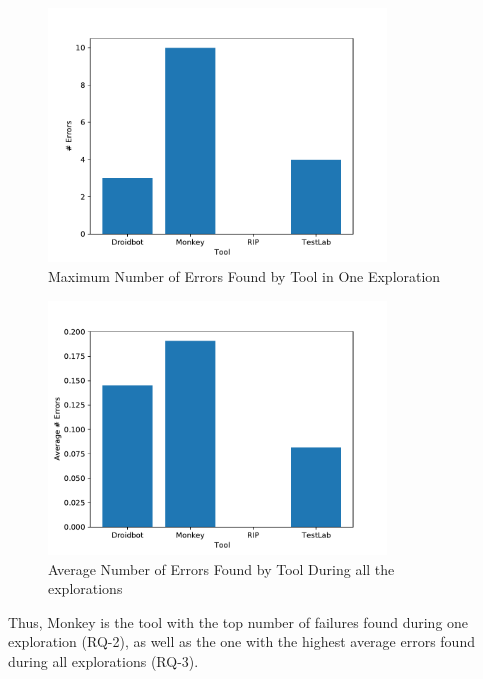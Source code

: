 \begin{figure}[h]
\centering
\includegraphics[width=0.8\textwidth]{../Figures/maxErrors.pdf}
\caption{Maximum Number of Errors Found by Tool in One Exploration}\label{fig:maxerrors}
\end{figure}

\begin{figure}[h]
\centering
\includegraphics[width=0.8\textwidth]{../Figures/averageErrors.pdf}
\caption{Average Number of Errors Found by Tool During all the explorations}\label{fig:averagaerrors}
\end{figure}

Thus, Monkey is the tool with the top number of failures found during one exploration (RQ-2), as well as the one with the highest average errors found during all explorations (RQ-3).